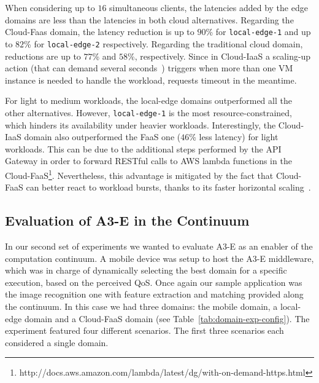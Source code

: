  When considering up to $16$ simultaneous clients, the latencies added by the edge domains are less than the latencies in both cloud alternatives. Regarding the Cloud-Faas domain, the latency reduction is up to $90$\% for \texttt{local-edge-1} and up to $82$\% for \texttt{local-edge-2} respectively. Regarding the traditional cloud domain, reductions are up to $77$\% and $58$\%, respectively. Since in Cloud-IaaS a scaling-up action (that can demand several seconds~\cite{Quatrocchi2016discrete}) triggers when more than one VM instance is needed to handle the workload, requests timeout in the meantime. 
 
 For light to medium workloads, the local-edge domains outperformed all the other alternatives. However, \texttt{local-edge-1} is the most resource-constrained, which hinders its availability under heavier workloads. Interestingly, the Cloud-IaaS domain also outperformed the FaaS one ($46$\% less latency) for light workloads. This can be due to the additional steps performed by the API Gateway in order to forward RESTful calls to AWS lambda functions in the Cloud-FaaS\footnote{http://docs.aws.amazon.com/lambda/latest/dg/with-on-demand-https.html}. Nevertheless, this advantage is mitigated by the fact that Cloud-FaaS can better react to workload bursts, thanks to its faster horizontal scaling~\cite{Villamizar2017lambda,Hendrickson:2016}.



\subsection{Evaluation of A3-E in the Continuum} 

In our second set of experiments we wanted to evaluate A3-E as an enabler of the computation continuum. A mobile device was setup to host the A3-E middleware, which was in charge of dynamically selecting the best domain for a specific execution, based on the perceived QoS. Once again our sample application was the image recognition one with feature extraction and matching provided along the continuum. In this case we had three domains: the mobile domain, a local-edge domain and a Cloud-FaaS domain (see Table~\ref{tab:domain-exp-config}). The experiment featured four different scenarios. The first three scenarios each considered a single  domain. 

